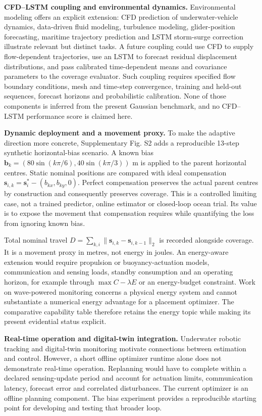 \documentclass[fleqn,10pt]{wlscirep}
\begin{document}
\textbf{CFD--LSTM coupling and environmental dynamics.} Environmental modeling offers an explicit extension: CFD prediction of underwater-vehicle dynamics\cite{liu2019}, data-driven fluid modeling\cite{brunton2020,vinuesa2023}, turbulence modeling\cite{novati2021}, glider-position forecasting\cite{qiu2023}, maritime trajectory prediction\cite{li2023,murray2022} and LSTM storm-surge correction\cite{giaremis2024} illustrate relevant but distinct tasks. A future coupling could use CFD to supply flow-dependent trajectories, use an LSTM to forecast residual displacement distributions, and pass calibrated time-dependent means and covariance parameters to the coverage evaluator. Such coupling requires specified flow boundary conditions, mesh and time-step convergence, training and held-out sequences, forecast horizons and probabilistic calibration. None of those components is inferred from the present Gaussian benchmark, and no CFD--LSTM performance score is claimed here.

\textbf{Dynamic deployment and a movement proxy.} To make the adaptive direction more concrete, Supplementary Fig. S2 adds a reproducible 13-step synthetic horizontal-bias scenario. A known bias $\mathbf b_k=(80\sin(k\pi/6),40\sin(k\pi/3))$ m is applied to the parent horizontal centres. Static nominal positions are compared with ideal compensation $\mathbf s_{i,k}=\mathbf s_i^*-(b_{kx},b_{ky},0)$. Perfect compensation preserves the actual parent centres by construction and consequently preserves coverage. This is a controlled limiting case, not a trained predictor, online estimator or closed-loop ocean trial. Its value is to expose the movement that compensation requires while quantifying the loss from ignoring known bias.

Total nominal travel $D=\sum_{k,i}\|\mathbf s_{i,k}-\mathbf s_{i,k-1}\|_2$ is recorded alongside coverage. It is a movement proxy in metres, not energy in joules. An energy-aware extension would require propulsion or buoyancy-actuation models, communication and sensing loads, standby consumption and an operating horizon, for example through $\max C-\lambda E$ or an energy-budget constraint. Work on wave-powered monitoring\cite{lu2024} concerns a physical energy system and cannot substantiate a numerical energy advantage for a placement optimizer. The comparative capability table therefore retains the energy topic while making its present evidential status explicit.

\textbf{Real-time operation and digital-twin integration.} Underwater robotic tracking\cite{masmitja2023} and digital-twin monitoring\cite{dong2025,mauro2023} motivate connections between estimation and control. However, a short offline optimizer runtime alone does not demonstrate real-time operation. Replanning would have to complete within a declared sensing-update period and account for actuation limits, communication latency, forecast error and correlated disturbances. The current optimizer is an offline planning component. The bias experiment provides a reproducible starting point for developing and testing that broader loop.
\end{document}

